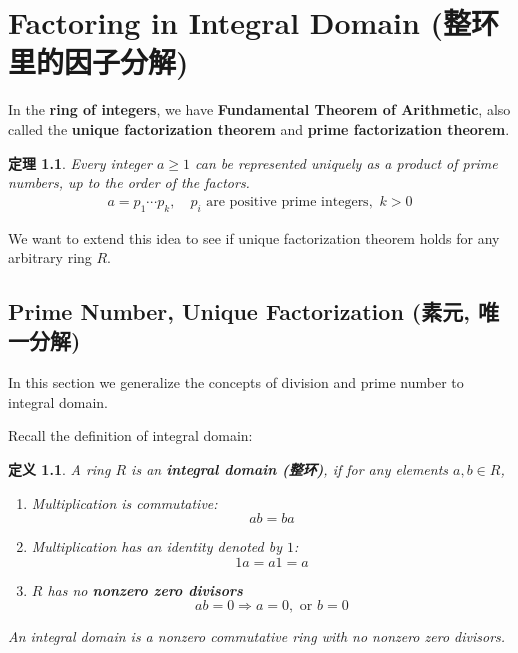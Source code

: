 \documentclass[utf8]{ctexbook}
\newtheorem{theorem}{定理}[section]
\newtheorem{definition}{定义}[section]
\begin{document}
\chapter{Factoring in Integral Domain (整环里的因子分解) }


In the \textbf{ring of integers}, we have \textbf{Fundamental Theorem of Arithmetic}, also called the \textbf{unique factorization theorem} and \textbf{prime factorization theorem}.

\begin{theorem}\label{theorem_integer_unique_factoring}
Every integer $a \geq 1$ can be represented uniquely as a product of prime numbers, up to the order of the factors.
\begin{align*}
a = p_1 \cdots p_k , \quad p_i \mbox{ are positive prime integers, }\, k > 0 
\end{align*}
\end{theorem}

We want to extend this idea to see if unique factorization theorem holds for any arbitrary ring $R$.


\section{Prime Number, Unique Factorization (素元, 唯一分解)}

In this section we generalize the concepts of division and prime number to integral domain.

Recall the definition of integral domain:

\begin{definition}\label{def_en_integral_domain}
A ring $R$ is an \textbf{integral domain (整环)}, if for any elements $a, b \in R$,
\begin{enumerate}
\item{Multiplication is commutative:
\begin{equation}
a b = b a
\end{equation}
}
\item{Multiplication has an identity denoted by $1$:
\begin{equation}
1 a = a 1 = a
\end{equation}
}
\item{$R$ has no \textbf{nonzero zero divisors}
\begin{equation}
ab = 0 \Rightarrow a = 0, \mbox{ or  } b = 0
\end{equation}
}
\end{enumerate}

An integral domain is a \emph{nonzero commutative ring with no nonzero zero divisors}.

\end{definition}
\end{document}
